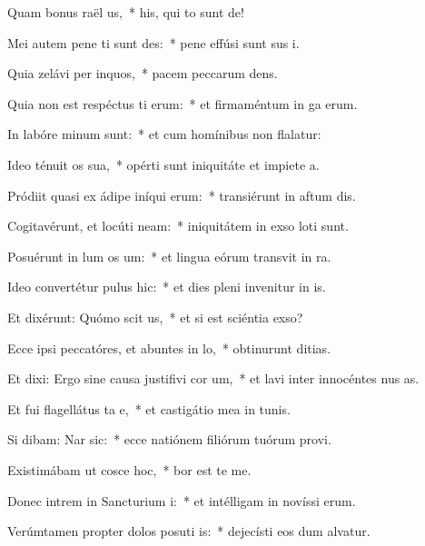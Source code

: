 \item Quam bonus raël us,~* his, qui to sunt de!
\item Mei autem pene ti sunt des:~* pene effúsi sunt sus i.
\item Quia zelávi per inquos,~* pacem peccarum dens.
\item Quia non est respéctus ti erum:~* et firmaméntum in ga erum.
\item In labóre minum  sunt:~* et cum homínibus non flalatur:
\item Ideo ténuit os sua,~* opérti sunt iniquitáte et impiete a.
\item Pródiit quasi ex ádipe iníqui erum:~* transiérunt in aftum dis.
\item Cogitavérunt, et locúti  neam:~* iniquitátem in exso loti sunt.
\item Posuérunt in lum os um:~* et lingua eórum transvit in ra.
\item Ideo convertétur pulus  hic:~* et dies pleni invenitur in is.
\item Et dixérunt: Quómo scit us,~* et si est sciéntia  exso?
\item Ecce ipsi peccatóres, et abuntes in lo,~* obtinurunt ditias.
\item Et dixi: Ergo sine causa justifivi cor um,~* et lavi inter innocéntes nus as.
\item Et fui flagellátus ta e,~* et castigátio mea in tunis.
\item Si dibam: Nar sic:~* ecce natiónem filiórum tuórum provi.
\item Existimábam ut cosce hoc,~* bor est te me.
\item Donec intrem in Sancturium i:~* et intélligam in novíssi erum.
\item Verúmtamen propter dolos posuti is:~* dejecísti eos dum alvatur.
